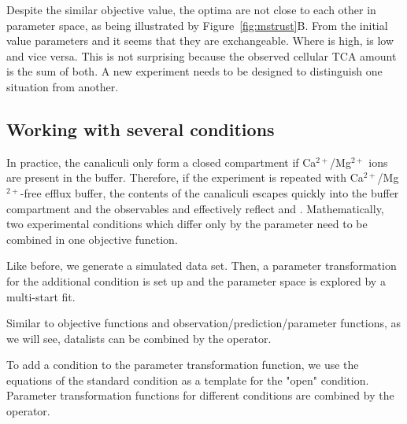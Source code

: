 \documentclass[article]{jss}
\begin{document}
Despite the similar objective value, the optima are not close to each other in parameter space, as being illustrated by Figure~\ref{fig:mstrust}B. From the initial value parameters  and  it seems that they are exchangeable. Where  is high,  is low and vice versa. This is not surprising because the observed cellular TCA amount is the sum of both. A new experiment needs to be designed to distinguish one situation from another.

\subsection{Working with several conditions}\label{sec:conditions}

In practice, the canaliculi only form a closed compartment if Ca$^{2+}$/Mg$^{2+}$ ions are present in the buffer. Therefore, if the experiment is repeated with Ca$^{2+}$/Mg$^{2+}$-free efflux buffer, the contents of the canaliculi escapes quickly into the buffer compartment and the observables  and  effectively reflect  and . Mathematically, two experimental conditions which differ only by the  parameter need to be combined in one objective function.

Like before, we generate a simulated data set. Then, a parameter transformation for the additional condition is set up and the parameter space is explored by a multi-start fit.

\begin{CodeChunk}
\end{CodeChunk}
Similar to objective functions and observation/prediction/parameter functions, as we will see, datalists can be combined by the  operator.

To add a condition to the parameter transformation function, we use the equations of the standard condition as a template for the "open" condition. Parameter transformation functions for different conditions are combined by the  operator.
\end{document}
